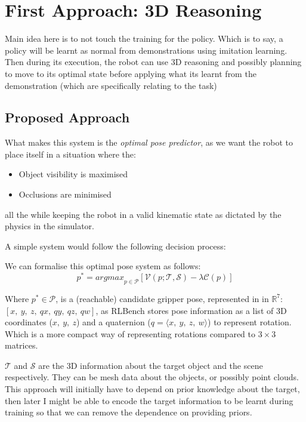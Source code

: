 \section{First Approach: 3D Reasoning}
Main idea here is to not touch the training for the policy. Which is to say, a policy will be learnt as normal from demonstrations using imitation learning. Then during its execution, the robot can use 3D reasoning and possibly planning to move to its optimal state before applying what its learnt from the demonstration (which are specifically relating to the task)

\subsection{Proposed Approach}
What makes this system is the \emph{optimal pose predictor}, as we want the robot to place itself in a situation where the:
\begin{itemize}
  \item Object visibility is maximised
  \item Occlusions are minimised
\end{itemize}
all the while keeping the robot in a valid kinematic state as dictated by the physics in the simulator.


A simple system would follow the following decision process:

We can formalise this optimal pose system as follows:
\[
p^* = {argmax}_{p \in \mathcal{P}}
  \left[
    \mathcal{V}\left(p; \mathcal{T}, \mathcal{S}\right)
    - 
    \lambda\mathcal{C}\left(p\right)
  \right]
\]

Where \(p^* \in \mathcal{P}\), is a (reachable) candidate gripper pose, represented in in \(\mathbb{R}^7\): \( \left[ x, ~y, ~z, ~qx, ~qy, ~qz, ~qw\right]\), as RLBench stores pose information as a list of 3D coordinates (\(x, ~y, ~z\)) and a quaternion (\(q = \langle x, ~y, ~z, ~w \rangle \)) to represent rotation. Which is a more compact way of representing rotations compared to $3\times3$ matrices.

$\mathcal{T}$ and $\mathcal{S}$ are the 3D information about the target object and the scene respectively. They can be mesh data about the objects, or possibly point clouds. This approach will initially have to depend on prior knowledge about the target, then later I might be able to encode the target information to be learnt during training so that we can remove the dependence on providing priors.

